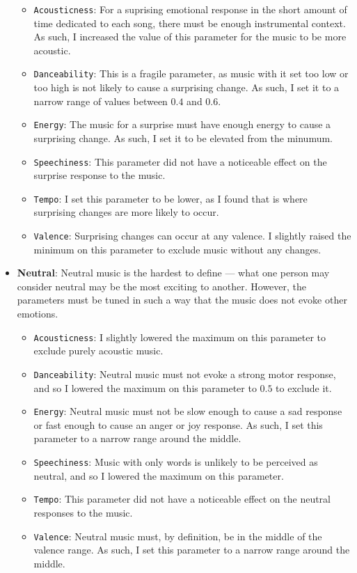 \documentclass{article}
\renewcommand{\_}[1]{\underline{ #1 }}
\theoremstyle{definition}
\begin{document}
\begin{itemize}
        \begin{itemize}
            \item \texttt{Acousticness}: For a suprising emotional response in the short amount of time dedicated to each song, there must be enough instrumental context. As such, I increased the value of this parameter for the music to be more acoustic.
            \item \texttt{Danceability}: This is a fragile parameter, as music with it set too low or too high is not likely to cause a surprising change. As such, I set it to a narrow range of values between $0.4$ and $0.6$. 
            \item \texttt{Energy}: The music for a surprise must have enough energy to cause a surprising change. As such, I set it to be elevated from the minumum.
            \item \texttt{Speechiness}: This parameter did not have a noticeable effect on the surprise response to the music.
            \item \texttt{Tempo}: I set this parameter to be lower, as I found that is where surprising changes are more likely to occur. 
            \item \texttt{Valence}: Surprising changes can occur at any valence. I slightly raised the minimum on this parameter to exclude music without any changes.
        \end{itemize}

    \item \textbf{Neutral}: Neutral music is the hardest to define --- what one person may consider neutral may be the most exciting to another. However, the parameters must be tuned in such a way that the music does not evoke other emotions.

        \begin{itemize}
            \item \texttt{Acousticness}: I slightly lowered the maximum on this parameter to exclude purely acoustic music.
            \item \texttt{Danceability}: Neutral music must not evoke a strong motor response, and so I lowered the maximum on this parameter to $0.5$ to exclude it.
            \item \texttt{Energy}: Neutral music must not be slow enough to cause a sad response or fast enough to cause an anger or joy response. As such, I set this parameter to a narrow range around the middle. 
            \item \texttt{Speechiness}: Music with only words is unlikely to be perceived as neutral, and so I lowered the maximum on this parameter.
            \item \texttt{Tempo}: This parameter did not have a noticeable effect on the neutral responses to the music.
            \item \texttt{Valence}: Neutral music must, by definition, be in the middle of the valence range. As such, I set this parameter to a narrow range around the middle.
        \end{itemize}

\end{itemize}
\end{document}
